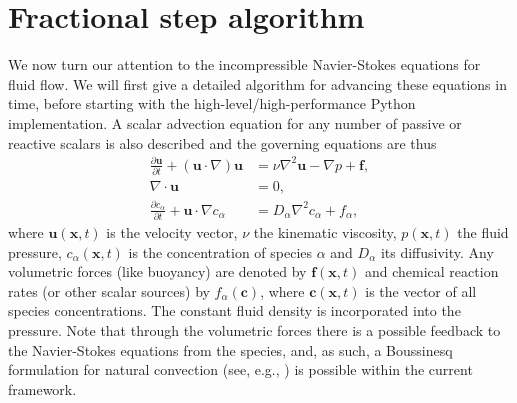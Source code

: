 \documentclass[final,3p,times,twocolumn]{elsarticle}
\newcounter{bla}
\begin{document}
\section{Fractional step algorithm}
\label{sec:frac_step}
We now turn our attention to the incompressible Navier-Stokes equations for fluid flow. We will first give a detailed algorithm for advancing these equations in time, before starting with the high-level/high-performance Python implementation. A scalar advection equation for any number of passive or reactive scalars is also described and the governing equations are thus
\begin{align}
  \frac{\partial \bm{u}}{\partial t} + (\bm{u} \cdot \nabla) \bm{u} &= \nu \nabla^2 \bm{u} - \nabla p + \bm{f}, \label{eq:NS} \\
  \nabla \cdot \bm{u} &= 0, \label{eq:div} \\
  \frac{\partial c_{\alpha}}{\partial t} + \bm{u} \cdot \nabla c_{\alpha} &= D_{\alpha} \nabla^2 c_{\alpha} + f_{\alpha}, \label{eq:scalar} 
\end{align}
where $\bm{u}(\bm{x}, t)$ is the velocity vector, $\nu$ the kinematic viscosity, $p(\bm{x}, t)$ the fluid pressure, $c_{\alpha}(\bm{x}, t)$ is the concentration of species $\alpha$ and $D_{\alpha}$ its diffusivity. Any volumetric forces (like buoyancy) are denoted by $\bm{f}(\bm{x}, t)$ and chemical reaction rates (or other scalar sources) by $f_{\alpha}(\bm{c})$, where $\bm{c}(\bm{x}, t)$ is the vector of all species concentrations. The constant fluid density is incorporated into the pressure. Note that through the volumetric forces there is a possible feedback to the Navier-Stokes equations from the species, and, as such, a Boussinesq formulation for natural convection (see, e.g., \cite{christon02}) is possible within the current framework.
\end{document}
